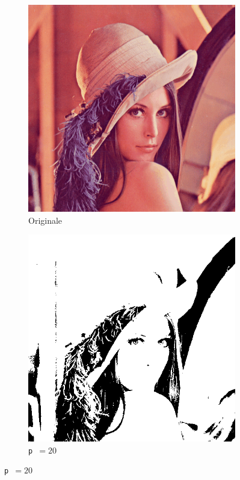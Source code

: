 \documentclass[12pt]{article}
\begin{document}
    \begin{figure}[H]
      \centering
      \begin{subfigure}[b]{0.33\textwidth}
        \centering
        \includegraphics[width=\textwidth]{tex/img/lena.png}
        \caption*{Originale}
      \end{subfigure}
      \hspace{0.15\textwidth}
      \begin{subfigure}[b]{0.33\textwidth}
        \centering
        \includegraphics[width=\textwidth]{img/lena-threshold-20.png}
        \caption*{\texttt{p }\( = 20\)}
      \end{subfigure}


\end{figure}
\end{document}
